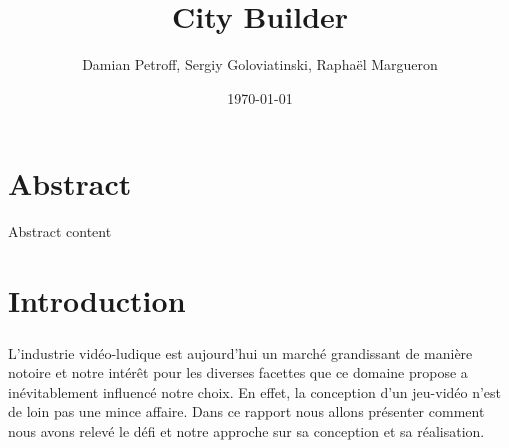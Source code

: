 \documentclass[a4paper,10pt,openany,oneside]{report}
\begin{document}
\begin{titlepage}
\title{City Builder}
\author{Damian Petroff, Sergiy Goloviatinski, Raphaël Margueron}
\date{\today}
\maketitle
\end{titlepage}


\thispagestyle{empty}
\pagebreak

\chapter*{Abstract}
\thispagestyle{empty}
Abstract content

\tableofcontents

\chapter*{Introduction}
\setcounter{page}{1}
\paragraph{}
L'industrie vidéo-ludique est aujourd'hui un marché grandissant de manière notoire et notre intérêt pour les diverses facettes que ce domaine propose a inévitablement influencé notre choix.
En effet, la conception d'un jeu-vidéo n'est de loin pas une mince affaire. Dans ce rapport nous allons présenter comment nous avons relevé le défi et notre approche sur sa conception et sa réalisation.
\end{document}
